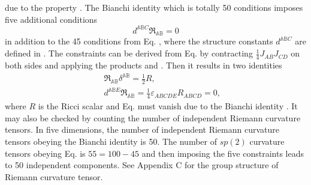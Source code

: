 \documentclass[12pt,epsf]{article}
\begin{document}
due to the property . The Bianchi identity  which is totally 50 conditions imposes
five additional conditions
\begin{equation}\label{5-bianchi}
d^{\mathbb{A}\mathbb{B} C}  \mathfrak{R}_{\mathbb{A}\mathbb{B}} = 0
\end{equation}
in addition to the 45 conditions from Eq. , where the structure constants $d^{\mathbb{A}\mathbb{B} C}$
are defined in . The constraints  can be derived
from Eq.  by contracting $\frac{1}{4} J_{AB} J_{CD}$ on both sides and
applying the products  and . Then it results in two identities
\begin{eqnarray} \label{iden-1}
  && \mathfrak{R}_{\mathbb{A}\mathbb{B}} \delta^{\mathbb{A}\mathbb{B}} = \frac{1}{2} R, \\
  \label{iden-2}
   && d^{\mathbb{A}\mathbb{B} E}  \mathfrak{R}_{\mathbb{A}\mathbb{B}} = \frac{1}{4} \varepsilon_{ABCDE} R_{ABCD} = 0,
\end{eqnarray}
where $R$ is the Ricci scalar and Eq.  must vanish due to the Bianchi identity .
It may also be checked by counting the number of independent Riemann curvature tensors.
In five dimensions, the number of independent Riemann curvature tensors obeying the Bianchi identity  is 50.
The number of $sp(2)$ curvature tensors obeying Eq.  is $55=100-45$ and then imposing the five constraints 
leads to 50 independent components.
See Appendix C for the group structure of Riemann curvature tensor.
\end{document}
